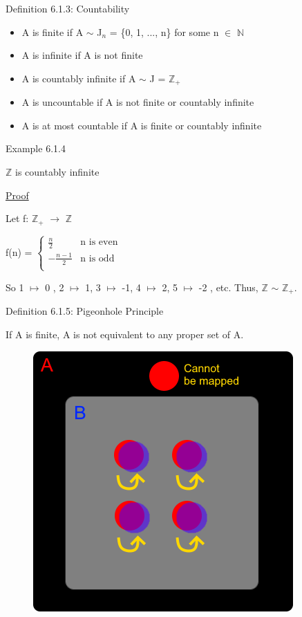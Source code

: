 { \color{blue} Definition 6.1.3: Countability } 
	\begin{itemize}[leftmargin=1cm, itemsep=0.1cm]
		\item A is {\color{lblue} finite} if A $\sim$ J$_n$ = \{0, 1, ..., n\}
			for some n $\in$ $\mathbb{N}$
		\item A is {\color{lblue} infinite} if A is not finite
		\item A is {\color{lblue} countably infinite} if A $\sim$ J = $\mathbb{Z}_+$
		\item A is {\color{lblue} uncountable} if A is not finite or countably infinite
		\item A is {\color{lblue} at most countable} if A is finite or countably infinite \\
	\end{itemize}

{ \color{purple} Example 6.1.4 } 

	\qquad $\mathbb{Z}$ is countably infinite

{ \color{magenta} \underline{Proof} } 

	Let f: $\mathbb{Z}_+$ $\rightarrow$ $\mathbb{Z}$

	\hspace{0.5cm} f(n) = 
	$
	\begin{cases}
		\frac{n}{2} & \text{n is even} \\
		-\frac{n-1}{2} & \text{n is odd} \\
	\end{cases}
	$

	So 1 $\mapsto$ 0 , 2 $\mapsto$ 1, 3 $\mapsto$ -1, 4 $\mapsto$ 2, 5 $\mapsto$ -2 , etc.
	Thus, $\mathbb{Z}$ $\sim$ $\mathbb{Z}_+$. \\ 

\newpage

{ \color{blue} Definition 6.1.5: Pigeonhole Principle } 

	\qquad If A is finite, A is not equivalent to any proper set of A.

	\begin{figure}[h]
	\centering
	\includegraphics[scale=0.5]{Images/6.1.5.png}
\end{figure}

